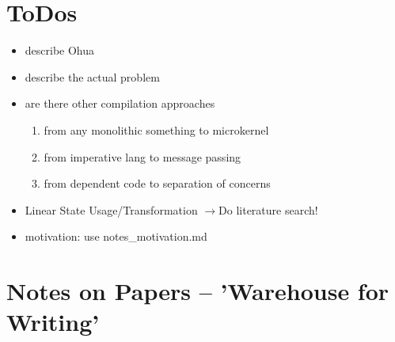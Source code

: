 \documentclass{scrartcl}
\newcommand{\means}{$\rightarrow{}$}
\begin{document}
\section{ToDos}
\begin{itemize}
    \item describe Ohua
    \item describe the actual problem
    \item are there other compilation approaches 
    \begin{enumerate}
        \item from any monolithic something to microkernel 
        \item from imperative lang to message passing 
        \item from dependent code to separation of concerns
    \end{enumerate}
    \item Linear State Usage/Transformation \means Do literature search!
    \item motivation: use notes\_motivation.md
\end{itemize}

\section{Notes on Papers -- 'Warehouse for Writing'}
\end{document}
